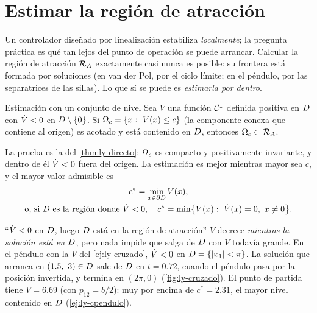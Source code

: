 \section{Estimar la región de atracción}
\label{sec:ly-region}

Un controlador diseñado por linealización estabiliza \emph{localmente}; la pregunta práctica es qué tan lejos del punto de operación se puede arrancar. Calcular la región de atracción $\mathcal{R}_A$ exactamente casi nunca es posible: su frontera está formada por soluciones (en van der Pol, por el ciclo límite; en el péndulo, por las separatrices de las sillas). Lo que sí se puede es \emph{estimarla por dentro}.

\begin{proposicion}[label=prop:ly-estimacion]{Estimación con un conjunto de nivel}
Sea $V$ una función $\mathcal{C}^{1}$ definida positiva en $D$ con $\dot V<0$ en $D\setminus\{0\}$. Si $\Omega_{c}=\{x:\ V(x)\le c\}$ (la componente conexa que contiene al origen) es acotado y está contenido en $D$, entonces $\Omega_{c}\subset\mathcal{R}_A$.
\end{proposicion}

La prueba es la del \cref{thm:ly-directo}: $\Omega_{c}$ es compacto y positivamente invariante, y dentro de él $\dot V<0$ fuera del origen. La estimación es mejor mientras mayor sea $c$, y el mayor valor admisible es
\begin{equation}
  \begin{gathered}
    c^*=\min_{x\in\partial D}V(x) ,\\
    \text{o, si }D\text{ es la región donde }\dot V<0,\quad c^*=\min\bigl\{V(x):\ \dot V(x)=0,\ x\neq0\bigr\} .
  \end{gathered}
  \label{eq:ly-cestrella}
\end{equation}

\begin{trampa}[label=tr:ly-region]{``$\dot V<0$ en $D$, luego $D$ está en la región de atracción''}
$V$ decrece \emph{mientras la solución está en $D$}, pero nada impide que salga de $D$ con $V$ todavía grande. En el péndulo con la $V$ del \cref{ej:ly-cruzado}, $\dot V<0$ en $D=\{\left\lvert x_1\right\rvert<\pi\}$. La solución que arranca en $(1.5,\ 3)\in D$ sale de $D$ en $t=0.72$, cuando el péndulo pasa por la posición invertida, y termina en $(2\pi,0)$ (\cref{fig:ly-cruzado}). El punto de partida tiene $V=6.69$ (con $p_{12}=b/2$): muy por encima de $c^*=2.31$, el mayor nivel contenido en $D$ (\cref{ej:ly-cpendulo}).
\end{trampa}

